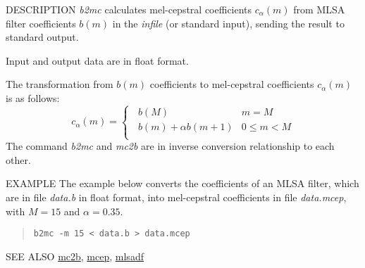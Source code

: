 \begin{synopsis}
\item [b2mc] [ --m $M$ ] [ --a $A$ ] [ {\em infile} ]
\end{synopsis}

\begin{qsection}{DESCRIPTION}
{\em b2mc} calculates mel-cepstral coefficients $c_\alpha(m)$ 
from MLSA filter coefficients $b(m)$ in the {\em infile} (or standard input), 
sending the result to standard output.

Input and output data are in float format.

The transformation from $b(m)$ coefficients to mel-cepstral coefficients
$c_\alpha(m)$ is as follows:
\begin{displaymath}
c_\alpha(m) = \begin{cases}
	  \;\; b(M) & m=M \\
	  \;\; b(m) + \alpha b(m+1) & 0 \leq m < M \\
	\end{cases}
\end{displaymath}
The command {\em b2mc} and {\em mc2b} are in inverse conversion
 relationship to each other.

\end{qsection}

\begin{options}
\end{options}

\begin{qsection}{EXAMPLE}
The example below converts the coefficients of an MLSA filter,
which are in file {\em data.b} in float format,
into mel-cepstral coefficients
in file {\em data.mcep}, with $M=15$ and $\alpha=0.35$.
\begin{quote}
 \verb!b2mc -m 15 < data.b > data.mcep!
\end{quote} 
\end{qsection}

\begin{qsection}{SEE ALSO}
\hyperlink{mc2b}{mc2b},
\hyperlink{mcep}{mcep},
\hyperlink{mlsadf}{mlsadf}
\end{qsection}
